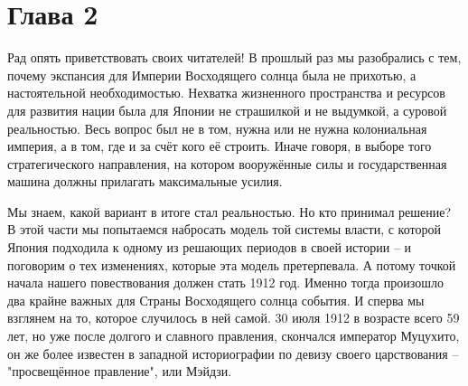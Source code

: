 \chapter{Глава 2}

Рад опять приветствовать своих читателей! В прошлый раз мы разобрались с тем, почему экспансия для Империи Восходящего солнца была не прихотью, а настоятельной необходимостью. Нехватка жизненного пространства и ресурсов для развития нации была для Японии не страшилкой и не выдумкой, а суровой реальностью. Весь вопрос был не в том, нужна или не нужна колониальная империя, а в том, где и за счёт кого её строить. Иначе говоря, в выборе того стратегического направления, на котором вооружённые силы и государственная машина должны прилагать максимальные усилия.

Мы знаем, какой вариант в итоге стал реальностью. Но кто принимал решение? В этой части мы попытаемся набросать модель той системы власти, с которой Япония подходила к одному из решающих периодов в своей истории – и поговорим о тех изменениях, которые эта модель претерпевала. А потому точкой начала нашего повествования должен стать 1912 год. Именно тогда произошло два крайне важных для Страны Восходящего солнца события. И сперва мы взглянем на то, которое случилось в ней самой. 30 июля 1912 в возрасте всего 59 лет, но уже после долгого и славного правления, скончался император Муцухито, он же более известен в западной историографии по девизу своего царствования – "просвещённое правление", или Мэйдзи.

